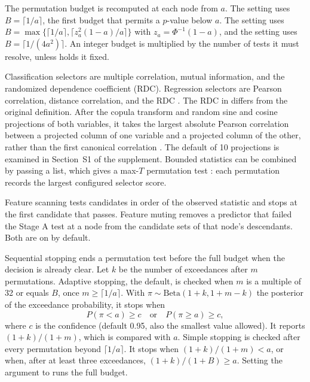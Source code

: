 \documentclass[article]{jss}
\newcommand{\citrees}{\pkg{citrees}\xspace}
\begin{document}
The permutation budget is recomputed at each node from $a$. The
 setting uses $B = \lceil 1/a \rceil$, the first budget that
permits a $p$-value below $a$. The  setting uses
$B = \max\{\lceil 1/a \rceil, \lceil z_a^2 (1-a)/a \rceil\}$ with
$z_a = \Phi^{-1}(1-a)$, and the  setting uses
$B = \lceil 1/(4a^2) \rceil$. An integer budget is multiplied by the number
of tests it must resolve, unless 
holds it fixed.

Classification selectors are multiple correlation, mutual information, and
the randomized dependence coefficient (RDC). Regression selectors are Pearson
correlation, distance correlation, and the RDC
\citep{Szekely+Rizzo+Bakirov:2007,Lopez-Paz+Hennig+Schoelkopf:2013}. The RDC
in \citrees differs from the original definition. After the copula transform
and random sine and cosine projections of both variables, it takes the largest
absolute Pearson correlation between a projected column of one variable and a
projected column of the other, rather than the first canonical correlation
\citep{Milletich+Downes+Goley+Hirst:2026}. The default of 10 projections is
examined in Section~S1 of the supplement. Bounded statistics can be combined
by passing a list, which gives a max-$T$ permutation test
\citep{Westfall+Young:1993}: each permutation records the largest configured
selector score.

Feature scanning tests candidates in order of the observed statistic and stops
at the first candidate that passes. Feature muting removes a predictor that
failed the Stage A test at a node from the candidate sets of that node's
descendants. Both are on by default.

Sequential stopping ends a permutation test before the full budget when the
decision is already clear. Let $k$ be the number of exceedances after $m$
permutations. Adaptive stopping, the default, is checked when $m$ is a
multiple of 32 or equals $B$, once $m \geq \lceil 1/a \rceil$. With
$\pi \sim \mathrm{Beta}(1+k, 1+m-k)$ the posterior of the exceedance
probability, it stops when
%
\begin{equation*}
  P(\pi < a) \geq c \quad \text{or} \quad P(\pi \geq a) \geq c ,
\end{equation*}
%
where $c$ is the confidence (default 0.95, also the smallest value allowed).
It reports $(1+k)/(1+m)$, which is compared with $a$. Simple stopping is
checked after every permutation beyond $\lceil 1/a \rceil$. It stops when
$(1+k)/(1+m) < a$, or when, after at least three exceedances,
$(1+k)/(1+B) \geq a$. Setting the argument to  runs the full
budget.
\end{document}
